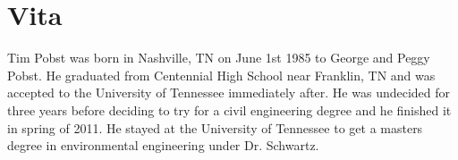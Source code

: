 \chapter*{Vita} \label{ch:vita}
Tim Pobst was born in Nashville, TN on June 1st 1985 to George and Peggy Pobst.  He graduated from Centennial High School near Franklin, TN and was accepted to the University of Tennessee immediately after.  He was undecided for three years before deciding to try for a civil engineering degree and he finished it in spring of 2011.  He stayed at  the University of Tennessee to get a masters degree in environmental engineering under Dr. Schwartz.